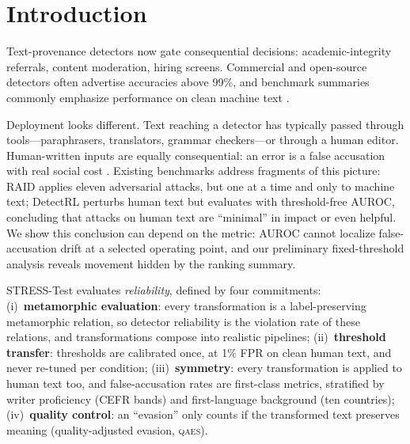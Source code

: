 \documentclass[11pt]{article}
\newcommand{\qaes}{\textsc{qaes}}
\newcommand{\stresstest}{STRESS-Test}
\begin{document}
\section{Introduction}

Text-provenance detectors now gate consequential decisions: academic-integrity
referrals, content moderation, hiring screens. Commercial and open-source
detectors often advertise accuracies above 99\%, and benchmark summaries
commonly emphasize performance on clean machine text
\citep{dugan2024raid,li2024mage,wang2024m4gt}.

Deployment looks different. Text reaching a detector has typically passed
through tools---paraphrasers, translators, grammar checkers---or through a
human editor. Human-written inputs are equally consequential: an error is a
false accusation with real social
cost \citep{liang2023gpt}. Existing benchmarks address fragments of this
picture: RAID \citep{dugan2024raid} applies eleven adversarial attacks, but
one at a time and only to machine text; DetectRL \citep{wu2024detectrl}
perturbs human text but evaluates with threshold-free AUROC, concluding that
attacks on human text are ``minimal'' in impact or even helpful. We show this
conclusion can depend on the metric: AUROC cannot localize false-accusation
drift at a selected operating point, and our preliminary fixed-threshold
analysis reveals movement hidden by the ranking summary.

\stresstest{} evaluates \emph{reliability}, defined by four commitments:
(i)~\textbf{metamorphic evaluation}: every transformation is a
label-preserving metamorphic relation, so detector reliability is the
violation rate of these relations, and transformations compose into realistic
pipelines; (ii)~\textbf{threshold transfer}: thresholds are calibrated once,
at 1\% FPR on clean human text, and never re-tuned per condition;
(iii)~\textbf{symmetry}: every transformation is applied to human text too,
and false-accusation rates are first-class metrics, stratified by writer
proficiency (CEFR bands) and first-language background (ten countries);
(iv)~\textbf{quality control}: an ``evasion'' only counts if the transformed
text preserves meaning (quality-adjusted evasion, \qaes).
\end{document}
